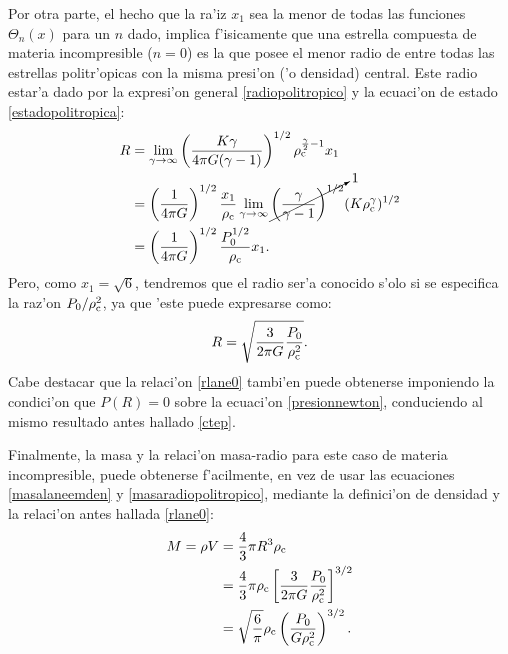 \begin{itemize}
Por otra parte, el hecho que la ra'iz $x_1$ sea la menor de todas las funciones $\Theta_n(x)$ para un $n$ dado, implica f'isicamente que una estrella compuesta de materia incompresible ($n=0$) es la que posee el menor radio de entre todas las estrellas politr'opicas con la misma presi'on ('o densidad) central. Este radio estar'a dado por la expresi'on general \eqref{radiopolitropico} y la ecuaci'on de estado \eqref{estadopolitropica}:
\begin{align}
 R&=\lim_{\gamma\to\infty}\left(\frac{K\gamma}{4\pi G(\gamma-1)}\right)^{1/2}\rho_{\rm c}^{\frac{\gamma}{2}-1}x_1\\
 &=\left(\frac{1}{4\pi G}\right)^{1/2}\frac{x_1}{\rho_{\rm c}}\lim_{\gamma\to\infty}\cancelto{1}{\left(\frac{\gamma}{\gamma-1}\right)^{1/2}}(K\rho_{\rm c}^\gamma)^{1/2}\\
 &=\left(\frac{1}{4\pi G}\right)^{1/2}\frac{P_0^{1/2}}{\rho_{\rm c}}x_1.
\end{align}
Pero, como $x_1=\sqrt{6}$, tendremos que el radio ser'a conocido s'olo si se especifica la raz'on $P_0/\rho_{\rm c}^2$, ya que 'este puede expresarse como:
\begin{equation}\label{rlane0}
 R=\sqrt{\frac{3}{2\pi G}\frac{P_0}{\rho_{\rm c}^2}}.
\end{equation}
Cabe destacar que la relaci'on \eqref{rlane0} tambi'en puede obtenerse imponiendo la condici'on que $P(R)=0$ sobre la ecuaci'on \eqref{presionnewton}, conduciendo al mismo resultado antes hallado \eqref{ctep}.

Finalmente, la masa y la relaci'on masa-radio para este caso de materia incompresible, puede obtenerse f'acilmente, en vez de usar las ecuaciones \eqref{masalaneemden} y \eqref{masaradiopolitropico}, mediante la definici'on de densidad y la relaci'on antes hallada \eqref{rlane0}:
\begin{align}
 M=\rho V&=\frac{4}{3}\pi R^3 \rho_{\rm c}\\
 &=\frac{4}{3}\pi\rho_{\rm c} \left[\frac{3}{2\pi G}\frac{P_0}{\rho_{\rm c}^2}\right]^{3/2}\\
 &=\sqrt{\frac{6}{\pi}}\rho_{\rm c} \left(\frac{P_0}{G\rho_{\rm c}^2}\right)^{3/2}.
\end{align}



\end{itemize}

